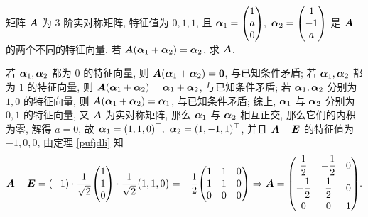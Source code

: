 \begin{example}
    矩阵 $\vb*{A}$ 为 3 阶实对称矩阵, 特征值为 $0,1,1$, 且 $\vb*{\alpha}_1=\mqty(1\\a\\0),~\vb*{\alpha}_2=\mqty(1\\-1\\a)$ 是 $\vb*{A}$ 的两个不同的特征向量, 若 $\vb*{A}(\vb*{\alpha}_1+\vb*{\alpha}_2)=\vb*{\alpha}_2$, 求 $\vb*{A}$.
\end{example}
\begin{solution}
    若 $\vb*{\alpha}_1,\vb*{\alpha}_2$ 都为 $0$ 的特征向量, 则 $\vb*{A}(\vb*{\alpha}_1+\vb*{\alpha}_2)=\vb*{0}$, 与已知条件矛盾;
    若 $\vb*{\alpha}_1,\vb*{\alpha}_2$ 都为 $1$ 的特征向量, 则 $\vb*{A}(\vb*{\alpha}_1+\vb*{\alpha}_2)=\vb*{\alpha}_1+\vb*{\alpha}_2$, 与已知条件矛盾;
    若 $\vb*{\alpha}_1,\vb*{\alpha}_2$ 分别为 $1,0$ 的特征向量, 则 $\vb*{A}(\vb*{\alpha}_1+\vb*{\alpha}_2)=\vb*{\alpha}_1$, 与已知条件矛盾;
    综上, $\vb*{\alpha}_1$ 与 $\vb*{\alpha}_2$ 分别为 $0,1$ 的特征向量, 又 $\vb*{A}$ 为实对称矩阵, 那么 $\vb*{\alpha}_1$ 与 $\vb*{\alpha}_2$ 相互正交, 那么它们的内积为零, 解得 $a=0$, 故
    $\vb*{\alpha}_1=(1,1,0)^\top,~\vb*{\alpha}_2=(1,-1,1)^\top$, 并且 $\vb*{A}-\vb*{E}$ 的特征值为 $-1,0,0$, 由定理 \ref{pufjdli} 知
    $$\vb*{A}-\vb*{E}=(-1)\cdot\dfrac{1}{\sqrt{2}}\mqty(1\\1\\0)\cdot\dfrac{1}{\sqrt{2}}\mqty(1,1,0)=-\dfrac{1}{2}\mqty(1&1&0\\1&1&0\\0&0&0)\Rightarrow \vb*{A}=\mqty(\dfrac{1}{2}&-\dfrac{1}{2}&0\\[6pt]-\dfrac{1}{2}&\dfrac{1}{2}&0\\[6pt]0&0&1).$$
\end{solution}

